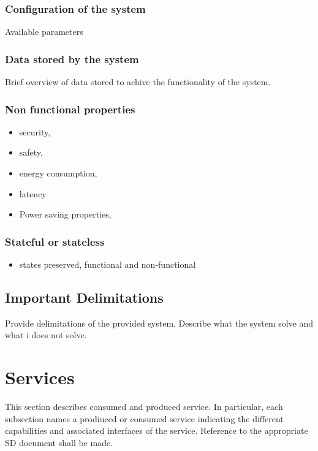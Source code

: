 \documentclass[a4paper]{arrowhead}
\begin{document}
\subsubsection {Configuration of the system}
Available parameters

\subsubsection {Data stored by the system}

Brief overview of data stored to achive the functionality of the system. 

\subsubsection {Non functional properties}

\begin{itemize}
  \item security, 
  \item safety, 
  \item energy consumption,
  \item latency
  \item Power saving properties, 
\end{itemize}

\subsubsection {Stateful or stateless}
\begin{itemize} 
\item states preserved, functional and non-functional
\end{itemize}  
\color{black}  


\subsection{Important Delimitations}
\label{sec:delimitations}

\color{red}
Provide delimitations of the provided system. Describe what the system
solve and what i does not solve.
\color{black}  



\newpage

\section{Services}
\label{sec:services}

\color{red}
This section describes consumed and produced service.
In particular, each subsection names a prodiuced or consumed service
indicating the different capabilities and associated interfaces of the
service. Reference to the appropriate SD document shall be made.
\color{black}
\end{document}
